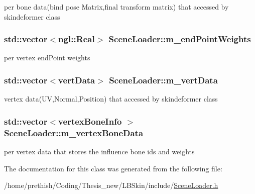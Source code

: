 per bone data(bind pose Matrix,final transform matrix) that accessed by skindeformer class 

\hypertarget{class_scene_loader_a543a0d0ac431a63e02bf618ced255ee0}{
\subsubsection[{m\-\_\-end\-Point\-Weights}]{\setlength{\rightskip}{0pt plus 5cm}std\-::vector$<$ngl\-::\-Real$>$ Scene\-Loader\-::m\-\_\-end\-Point\-Weights}}\label{class_scene_loader_a543a0d0ac431a63e02bf618ced255ee0}


per vertex end\-Point weights 

\hypertarget{class_scene_loader_a55597764e53f19f90331ee48fb8dab4c}{
\subsubsection[{m\-\_\-vert\-Data}]{\setlength{\rightskip}{0pt plus 5cm}std\-::vector$<${\bf vert\-Data}$>$ Scene\-Loader\-::m\-\_\-vert\-Data}}\label{class_scene_loader_a55597764e53f19f90331ee48fb8dab4c}


vertex data(\-U\-V,\-Normal,\-Position) that accessed by skindeformer class 

\hypertarget{class_scene_loader_a1835f991ea13ab5521868e603a62c8f0}{
\subsubsection[{m\-\_\-vertex\-Bone\-Data}]{\setlength{\rightskip}{0pt plus 5cm}std\-::vector$<${\bf vertex\-Bone\-Info} $>$ Scene\-Loader\-::m\-\_\-vertex\-Bone\-Data}}\label{class_scene_loader_a1835f991ea13ab5521868e603a62c8f0}


per vertex data that stores the influence bone ids and weights 



The documentation for this class was generated from the following file\-:\begin{DoxyCompactItemize}
\item 
/home/prethish/\-Coding/\-Thesis\-\_\-new/\-L\-B\-Skin/include/\hyperlink{_scene_loader_8h}{Scene\-Loader.\-h}\end{DoxyCompactItemize}
